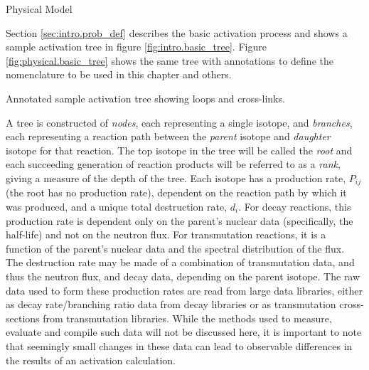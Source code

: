 \begin{chapter}{Physical Model\label{chap:physical}}

Section \ref{sec:intro.prob_def} describes the basic activation
process and shows a sample activation tree in figure
\ref{fig:intro.basic_tree}.  Figure \ref{fig:physical.basic_tree}
shows the same tree with annotations to define the nomenclature to be
used in this chapter and others.

\begin{floatingfigure}{0.55\columnwidth}
  \begin{center}
    \caption{Annotated sample activation tree showing loops and
      cross-links.}\label{fig:physical.basic_tree}
  \end{center}
\end{floatingfigure}

A tree is constructed of \textsl{nodes}, each representing a single
isotope, and \linebreak \textsl{branches}, each representing a reaction path
between the \textsl{parent} isotope and \textsl{daughter} isotope for
that reaction.  The top isotope in the tree will be called the
\textsl{root} and each succeeding generation of reaction products will
be referred to as a \textsl{rank}, giving a measure of the depth of
the tree.  Each isotope has a production rate, $P_{ij}$ (the root has
no production rate), dependent on the reaction path by which it was
produced, and a unique total destruction rate, $d_i$.  For decay
reactions, this production rate is dependent only on the parent's
nuclear data (specifically, the half-life) and not on the neutron
flux.  For transmutation reactions, it is a function of the parent's
nuclear data and the spectral distribution of the flux.  The
destruction rate may be made of a combination of transmutation data,
and thus the neutron flux, and decay data, depending on the parent
isotope.  The raw data used to form these production rates are read
from large data libraries, either as decay rate/branching ratio data
from decay libraries or as transmutation cross-sections from
transmutation libraries.  While the methods used to measure, evaluate
and compile such data\cite{EAF,FENDL2} will not be discussed here, it
is important to note that seemingly small changes in these data can
lead to observable differences in the results of an activation
calculation.


\end{chapter}
